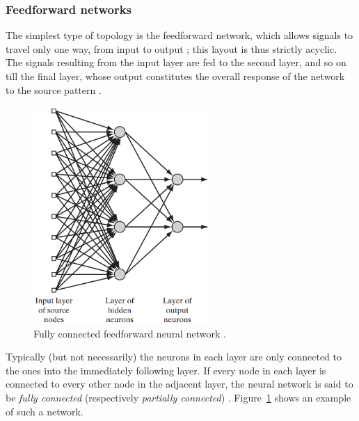 \documentclass[11pt,a4paper]{report}
\begin{document}
				\subsubsection{Feedforward networks}
				The simplest type of topology is the feedforward network, which allows signals to travel only one way, from input to output \cite{kotsiantis2007supervised}; this layout is thus strictly acyclic. The signals resulting from the input layer are fed to the second layer, and so on till the final layer, whose output constitutes the overall response of the network to the source pattern \cite{haykin2009neural}.
				
				\begin{figure}[h]
					\centering
					\includegraphics[width=0.6\textwidth]{feedforward}
					\caption{Fully connected feedforward neural network \cite{haykin2009neural}.}
					\label{fig:feedforward}
				\end{figure}
				
				Typically (but not necessarily) the neurons in each layer are only connected to the ones into the immediately following layer. If every node in each layer is connected to every other node in the adjacent layer, the neural network is said to be \emph{fully connected} (respectively \emph{partially connected}) \cite{haykin2009neural}. Figure~\ref{fig:feedforward} shows an example of such a network.
				
\end{document}
